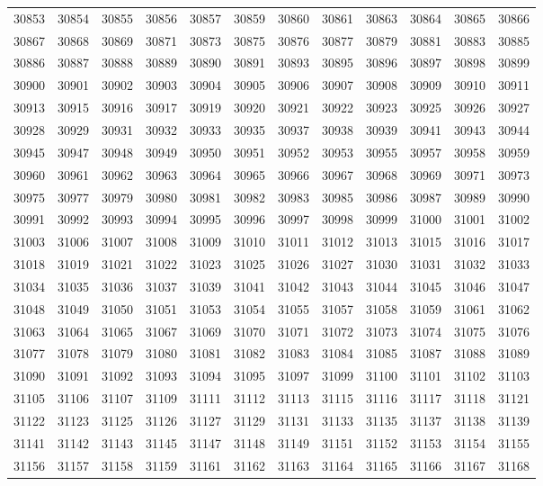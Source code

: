 \begin{center}
\begin{longtable}{llllllllllll}
30853 &30854 &30855 &30856 &30857 &30859 &30860 &30861 &30863 &30864 &30865 &30866 \\
30867 &30868 &30869 &30871 &30873 &30875 &30876 &30877 &30879 &30881 &30883 &30885 \\
30886 &30887 &30888 &30889 &30890 &30891 &30893 &30895 &30896 &30897 &30898 &30899 \\
30900 &30901 &30902 &30903 &30904 &30905 &30906 &30907 &30908 &30909 &30910 &30911 \\
30913 &30915 &30916 &30917 &30919 &30920 &30921 &30922 &30923 &30925 &30926 &30927 \\
30928 &30929 &30931 &30932 &30933 &30935 &30937 &30938 &30939 &30941 &30943 &30944 \\
30945 &30947 &30948 &30949 &30950 &30951 &30952 &30953 &30955 &30957 &30958 &30959 \\
30960 &30961 &30962 &30963 &30964 &30965 &30966 &30967 &30968 &30969 &30971 &30973 \\
30975 &30977 &30979 &30980 &30981 &30982 &30983 &30985 &30986 &30987 &30989 &30990 \\
30991 &30992 &30993 &30994 &30995 &30996 &30997 &30998 &30999 &31000 &31001 &31002 \\
31003 &31006 &31007 &31008 &31009 &31010 &31011 &31012 &31013 &31015 &31016 &31017 \\
31018 &31019 &31021 &31022 &31023 &31025 &31026 &31027 &31030 &31031 &31032 &31033 \\
31034 &31035 &31036 &31037 &31039 &31041 &31042 &31043 &31044 &31045 &31046 &31047 \\
31048 &31049 &31050 &31051 &31053 &31054 &31055 &31057 &31058 &31059 &31061 &31062 \\
31063 &31064 &31065 &31067 &31069 &31070 &31071 &31072 &31073 &31074 &31075 &31076 \\
31077 &31078 &31079 &31080 &31081 &31082 &31083 &31084 &31085 &31087 &31088 &31089 \\
31090 &31091 &31092 &31093 &31094 &31095 &31097 &31099 &31100 &31101 &31102 &31103 \\
31105 &31106 &31107 &31109 &31111 &31112 &31113 &31115 &31116 &31117 &31118 &31121 \\
31122 &31123 &31125 &31126 &31127 &31129 &31131 &31133 &31135 &31137 &31138 &31139 \\
31141 &31142 &31143 &31145 &31147 &31148 &31149 &31151 &31152 &31153 &31154 &31155 \\
31156 &31157 &31158 &31159 &31161 &31162 &31163 &31164 &31165 &31166 &31167 &31168 \\

\end{longtable}
\end{center}
